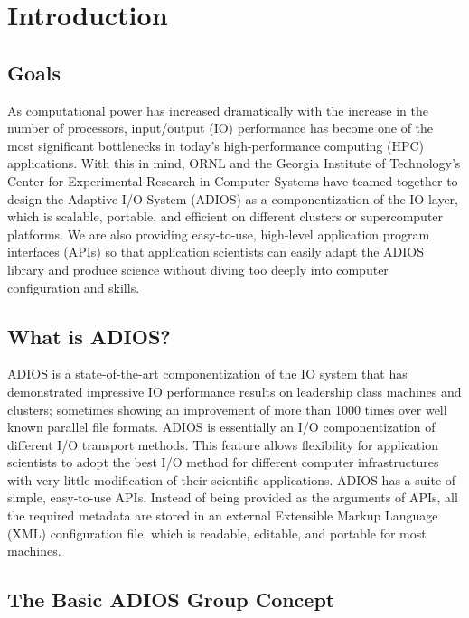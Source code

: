 \chapter{Introduction}

\section{Goals}

As computational power has increased dramatically with the increase in the number 
of processors, input/output (IO) performance has become one of the most significant 
bottlenecks in today's high-performance computing (HPC) applications. With this 
in mind, ORNL and the Georgia Institute of Technology's Center for Experimental 
Research in Computer Systems have teamed together to design the Adaptive I/O System 
(ADIOS) as a componentization of the IO layer, which is scalable, portable, and 
efficient on different clusters or supercomputer platforms. We are also providing 
easy-to-use, high-level application program interfaces (APIs) so that application 
scientists can easily adapt the ADIOS library and produce science without diving 
too deeply into computer configuration and skills. 

\section{What is ADIOS?}

{\color{color01} ADIOS is a state-of-the-art componentization of the IO system 
that has demonstrated impressive IO performance results on leadership class machines 
and clusters; sometimes showing an improvement of more than 1000 times over well 
known parallel file formats. }ADIOS is essentially an I/O componentization of different 
I/O transport methods. This feature allows flexibility for application scientists 
to adopt the best I/O method for different computer infrastructures with very little 
modification of their scientific applications. ADIOS has a suite of simple, easy-to-use 
APIs. Instead of being provided as the arguments of APIs, all the required metadata 
are stored in an external Extensible Markup Language (XML) configuration file, 
which is readable, editable, and portable for most machines. 

\section{The Basic ADIOS Group Concept}

